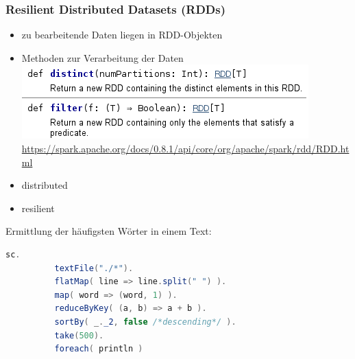 \begin{frame}
    \frametitle{Resilient Distributed Datasets (RDDs)}
    \begin{itemize}
        \item zu bearbeitende Daten liegen in RDD-Objekten
        \item Methoden zur Verarbeitung der Daten
              \includegraphics[scale=1.0]{rdd-disting-filter.png}
              \textcolor{gray}{\scriptsize{\url{
                 https://spark.apache.org/docs/0.8.1/api/core/org/apache/spark/rdd/RDD.html
              }}}
        \item distributed
        \item resilient
    \end{itemize}
\end{frame}


\begin{frame}
    Ermittlung der häufigsten Wörter in einem Text:

    \begin{lstlisting}[language=java]   % scala
        sc.
          textFile("./*").
          flatMap( line => line.split(" ") ).
          map( word => (word, 1) ).
          reduceByKey( (a, b) => a + b ).
          sortBy( _._2, false /*descending*/ ).
          take(500).
          foreach( println )
    \end{lstlisting}


\end{frame}

